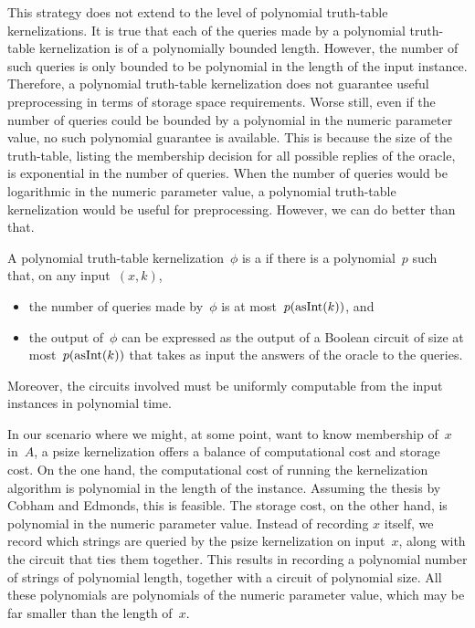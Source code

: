 This strategy does not extend to the level of polynomial truth-table kernelizations.
It is true that each of the queries made by a polynomial truth-table kernelization is of a polynomially bounded length.
However, the number of such queries is only bounded to be polynomial in the length of the input instance.
Therefore, a polynomial truth-table kernelization does not guarantee useful preprocessing in terms of storage space requirements.
Worse still, even if the number of queries could be bounded by a polynomial in the numeric parameter value, no such polynomial guarantee is available.
This is because the size of the truth-table, listing the membership decision for all possible replies of the oracle, is exponential in the number of queries.
When the number of queries would be logarithmic in the numeric parameter value, a polynomial truth-table kernelization would be useful for preprocessing.
However, we can do better than that.
\begin{definition}
  A polynomial truth-table kernelization~$\phi$ is a  if there is a polynomial~$p$ such that, on any input~$(x, k)$,
  \begin{itemize}
  \item the number of queries made by~$\phi$ is at most~$p(\operatorname{asInt}(k))$, and
  \item the output of~$\phi$ can be expressed as the output of a Boolean circuit of size at most~$p(\operatorname{asInt}(k))$ that takes as input the answers of the oracle to the queries.
  \end{itemize}
  Moreover, the circuits involved must be uniformly computable from the input instances in polynomial time.
\end{definition}

In our scenario where we might, at some point, want to know membership of~$x$ in~$A$, a psize kernelization offers a balance of computational cost and storage cost.
On the one hand, the computational cost of running the kernelization algorithm is polynomial in the length of the instance.
Assuming the thesis by Cobham and Edmonds, this is feasible.
The storage cost, on the other hand, is polynomial in the numeric parameter value.
Instead of recording $x$ itself, we record which strings are queried by the psize kernelization on input~$x$, along with the circuit that ties them together.
This results in recording a polynomial number of strings of polynomial length, together with a circuit of polynomial size.
All these polynomials are polynomials of the numeric parameter value, which may be far smaller than the length of~$x$.

